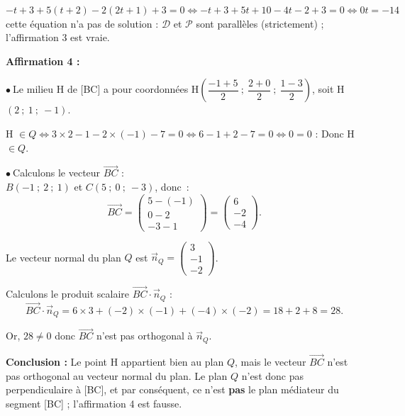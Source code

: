 $- t + 3 + 5(t + 2) - 2(2t + 1)  + 3 = 0 \iff -t + 3 + 5t + 10 - 4t - 2 + 3 = 0 \iff 0t = - 14$  cette équation n'a pas de solution : $\mathcal{D}$ et $\mathcal{P}$ sont parallèles (strictement) ; l'affirmation 3 est vraie.
\medskip

\textbf{Affirmation 4 :}






$\bullet~$Le milieu H de [BC] a pour coordonnées H$\left(\dfrac{-1 + 5}{2}~;~\dfrac{2 + 0}{2}~;~\dfrac{1 - 3}{2}\right)$, soit H$(2~;~1~;~-1)$.

H $\in Q \iff 3 \times 2 - 1 - 2 \times (-1) - 7 = 0 \iff 6 - 1 + 2 - 7 = 0 \iff 0 = 0$ : Donc H $\in Q$.

\vspace{0.5em}

$\bullet~$Calculons le vecteur $\vec{BC}$ :\\
$B(-1~;~2~;~1)$ et $C(5~;~0~;~-3)$, donc~:
\[
\vec{BC} = \begin{pmatrix} 5 - (-1) \\ 0 - 2 \\ -3 - 1 \end{pmatrix} = \begin{pmatrix} 6 \\ -2 \\ -4 \end{pmatrix}.
\]

Le vecteur normal du plan $Q$ est $\vec{n}_Q = \begin{pmatrix} 3 \\ -1 \\ -2 \end{pmatrix}$.

Calculons le produit scalaire $\vec{BC} \cdot \vec{n}_Q$ :
\[
\vec{BC} \cdot \vec{n}_Q = 6 \times 3 + (-2) \times (-1) + (-4) \times (-2) = 18 + 2 + 8 = 28.
\]

Or, $28 \neq 0$ donc $\vec{BC}$ n'est pas orthogonal à $\vec{n}_Q$.

\vspace{0.5em}

\textbf{Conclusion :} Le point H appartient bien au plan $Q$, mais le vecteur $\vec{BC}$ n'est pas orthogonal au vecteur normal du plan. Le plan $Q$ n'est donc pas perpendiculaire à [BC], et par conséquent, ce n'est \textbf{pas} le plan médiateur du segment [BC] ; l'affirmation 4 est fausse.


\medskip
